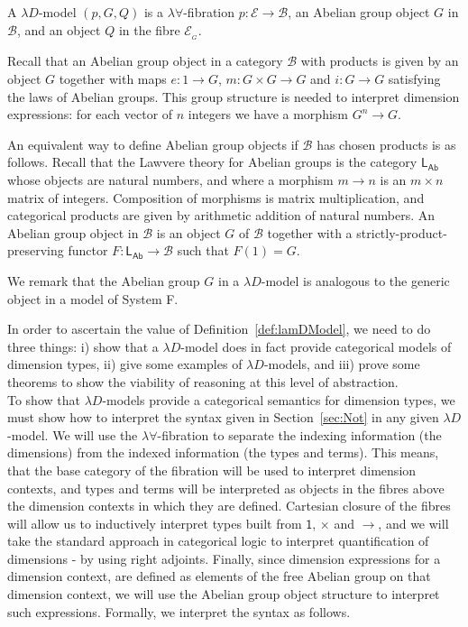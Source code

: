 \documentclass[a4paper,UKenglish]{lipics}
\newcommand{\SystemF}{System F\xspace}
\newcommand{\msf}[1]{\mathsf{#1}} %
\newcommand{\LAb}{\msf{L}_{\msf{Ab}}}
\newcommand{\B}{\mathcal{B}}
\newcommand{\E}{\mathcal{E}}
\newcommand{\fibreE}[1]{\E_{_{#1}}}
\newcommand{\unitTy}{\msf{1}}
\begin{document}
\begin{definition}\label{def:lamDModel}
A $\lambda D$-model $(p,G, Q)$ is a $\lambda \forall$-fibration $p:\E\to \B$, an Abelian group object $G$ in $\B$, and an object $Q$ in the fibre $\fibreE{G}$.
\end{definition}

Recall that an Abelian group object in a category $\B$ with products is given by an object $G$ together with maps $e:1\to G$, $m:G\times G\to G$ and $i:G\to G$ satisfying the laws of Abelian groups. This group structure is needed to interpret dimension expressions: for each vector of $n$ integers we have a morphism $G^n\to G$.

An equivalent way to define Abelian group objects if $\B$ has chosen products is as follows. Recall that the Lawvere theory for Abelian groups is the category $\LAb$ whose objects are natural numbers, and where a morphism $m\to n$ is an $m\times n$ matrix of integers. Composition of morphisms is matrix multiplication, and categorical products are given by arithmetic addition of natural numbers. An Abelian group object in $\B$ is an object $G$ of $\B$ together with a strictly-product-preserving functor $F:\LAb\to\B$ such that $F(1)=G$.

We remark that the Abelian group $G$ in a $\lambda D$-model is analogous to the generic object in a model of \SystemF.

In order to ascertain the value of Definition~\ref{def:lamDModel}, we
need to do three things: i) show that a $\lambda D$-model does in fact provide categorical models of dimension types, ii) give some examples of $\lambda D$-models, and iii) prove some theorems to show the viability of reasoning at this level of abstraction.\\




To show that $\lambda D$-models provide a categorical semantics for dimension types, we must show how to interpret the syntax given in Section~\ref{sec:Not} in any given $\lambda D$-model. We will use the $\lambda \forall$-fibration to separate the indexing information (the dimensions) from the indexed information (the types and terms). This means, that the base category of the fibration will be used to interpret dimension contexts, and types and terms will be interpreted as objects in the fibres above the dimension contexts in which they are defined. Cartesian closure of the fibres will allow us to inductively interpret types built from $\unitTy$, $\times$ and $\rightarrow$, and we will take the standard approach in categorical logic to interpret quantification of dimensions - by using right adjoints. Finally, since dimension expressions for a dimension context, are defined as elements of the free Abelian group on that dimension context, we will use the Abelian group object structure to interpret such
expressions. Formally, we interpret the
syntax as follows.
\end{document}
